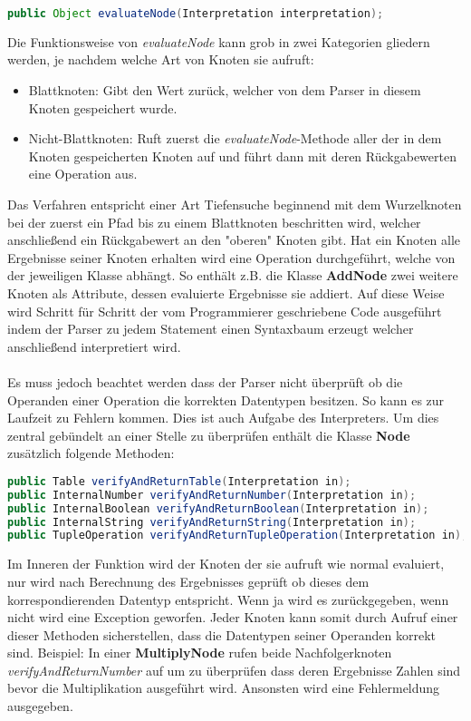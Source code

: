 \begin{lstlisting}[caption=Funktionsdeklaration der Methode \textit{evaluateNode}, language=Java]
public Object evaluateNode(Interpretation interpretation);
\end{lstlisting}
Die Funktionsweise von \textit{evaluateNode} kann grob in zwei Kategorien gliedern werden, je nachdem welche Art von Knoten sie aufruft:
\begin{itemize}
  \item Blattknoten: Gibt den Wert zurück, welcher von dem Parser in diesem Knoten gespeichert wurde.
  \item Nicht-Blattknoten: Ruft zuerst die \textit{evaluateNode}-Methode aller der in dem Knoten gespeicherten Knoten auf und führt dann mit deren Rückgabewerten eine Operation aus.
\end{itemize}
Das Verfahren entspricht einer Art Tiefensuche beginnend mit dem Wurzelknoten bei der zuerst ein Pfad bis zu einem Blattknoten beschritten wird, welcher anschließend ein Rückgabewert an den "oberen" Knoten gibt. Hat ein Knoten alle Ergebnisse seiner Knoten erhalten wird eine Operation durchgeführt, welche von der jeweiligen Klasse abhängt. So enthält z.B. die Klasse \textbf{AddNode} zwei weitere Knoten als Attribute, dessen evaluierte Ergebnisse sie addiert.
Auf diese Weise wird Schritt für Schritt der vom Programmierer geschriebene Code ausgeführt indem der Parser zu jedem Statement einen Syntaxbaum erzeugt welcher anschließend interpretiert wird.
\\\\
Es muss jedoch beachtet werden dass der Parser nicht überprüft ob die Operanden einer Operation die korrekten Datentypen besitzen. So kann es zur Laufzeit zu Fehlern kommen. Dies ist auch Aufgabe des Interpreters. Um dies zentral gebündelt an einer Stelle zu überprüfen enthält die Klasse \textbf{Node} zusätzlich folgende Methoden:
\newpage

\begin{lstlisting}[caption=Methoden zur Typüberprüfung, language=Java]
public Table verifyAndReturnTable(Interpretation in);
public InternalNumber verifyAndReturnNumber(Interpretation in);
public InternalBoolean verifyAndReturnBoolean(Interpretation in);
public InternalString verifyAndReturnString(Interpretation in);
public TupleOperation verifyAndReturnTupleOperation(Interpretation in);
\end{lstlisting}
Im Inneren der Funktion wird der Knoten der sie aufruft wie normal evaluiert, nur wird nach Berechnung des Ergebnisses geprüft ob dieses dem korrespondierenden Datentyp entspricht. Wenn ja wird es zurückgegeben, wenn nicht wird eine Exception geworfen.
Jeder Knoten kann somit durch Aufruf einer dieser Methoden sicherstellen, dass die Datentypen seiner Operanden korrekt sind. Beispiel: In einer \textbf{MultiplyNode} rufen beide Nachfolgerknoten \textit{verifyAndReturnNumber} auf um zu überprüfen dass deren Ergebnisse Zahlen sind bevor die Multiplikation ausgeführt wird. Ansonsten wird eine Fehlermeldung ausgegeben.

